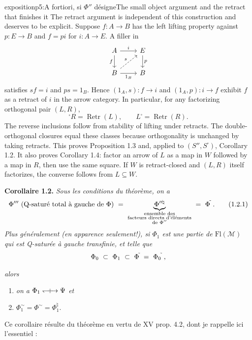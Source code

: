 \begin{dcomment}{exposition}{p5:A fortiori, si $\Phi''$ désigne}{The small object argument and the retract that finishes it}
The retract argument is independent of this construction and deserves to be explicit. Suppose $f:A\to B$ has the left lifting property against $p:E\to B$ and $f=pi$ for $i:A\to E$. A filler in
\[
\begin{tikzcd}
A\arrow[r,"i"]\arrow[d,"f"'] & E\arrow[d,"p"]\\
B\arrow[r,"1_B"']\arrow[ur,dashed,"s"] & B
\end{tikzcd}
\]
satisfies $sf=i$ and $ps=1_B$. Hence $(1_A,s):f\to i$ and $(1_A,p):i\to f$ exhibit $f$ as a retract of $i$ in the arrow category. In particular, for any factorizing orthogonal pair $(L,R)$,
\[
{}^{\square}R=\operatorname{Retr}(L),\qquad
L^{\square}=\operatorname{Retr}(R).
\]
The reverse inclusions follow from stability of lifting under retracts. The double-orthogonal closures equal these classes because orthogonality is unchanged by taking retracts. This proves Proposition 1.3 and, applied to $(S'',S^{\square})$, Corollary 1.2. It also proves Corollary 1.4: factor an arrow of $L$ as a map in $W$ followed by a map in $R$, then use the same square. If $W$ is retract-closed and $(L,R)$ itself factorizes, the converse follows from $L\subseteq W$.
\end{dcomment}


\bigskip

\textbf{Corollaire 1.2.} \textit{Sous les conditions du théorème, on a}
\[
\Phi''' \ \text{(Q-saturé total à gauche de $\Phi$)} \ = \
\underbrace{\Phi^{\prime\prime\natural}}_{\substack{\text{ensemble des}\\ \text{facteurs directs d'éléments}\\ \text{de $\Phi''$}}}
\ = \ \Phi^{\tld}\ .
\tag*{(1.2.1)}
\]
\textit{Plus généralement (en apparence seulement!), si $\Phi_1$ est une partie de \textup{$\mathrm{Fl}(\mathcal{M})$} qui est \textup{Q}-saturée à gauche transfinie, et telle que}
\[
\Phi_0 \ \subset \ \Phi_1 \ \subset \ \Phi^{\tld} \ = \ \Phi_0{}^{\tld}\ ,
\]


\textit{alors}
\begin{enumerate}[label={}]
\item[a)] \textit{on a $\Phi_1 \mathrel{\leftharpoondown\mkern-9mu{+}\mkern-9mu\rightarrow} \Psi$ et} %
\item[b)] $\Phi_1^{\sim} = \Phi^{\sim} = \Phi_1^{\natural}$.
\end{enumerate}
Ce corollaire résulte du théorème en vertu de XV prop. 4.2, dont je rappelle ici l'essentiel :

